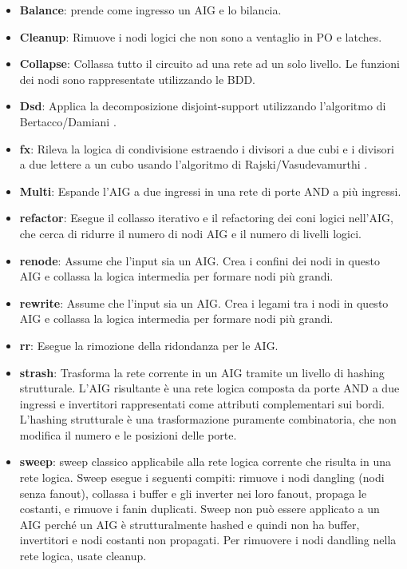 \documentclass[
  italian,
]{book}
\providecommand{\tightlist}{%
  \setlength{\itemsep}{0pt}\setlength{\parskip}{0pt}}
\begin{document}
\begin{itemize}
\tightlist
\item
  \textbf{Balance}: prende come ingresso un AIG e lo bilancia.
\item
  \textbf{Cleanup}: Rimuove i nodi logici che non sono a ventaglio in PO e latches.
\item
  \textbf{Collapse}: Collassa tutto il circuito ad una rete ad un solo livello. Le funzioni dei nodi sono rappresentate utilizzando le BDD.
\item
  \textbf{Dsd}: Applica la decomposizione disjoint-support utilizzando l'algoritmo di Bertacco/Damiani \citep{ICCAD97}.
\item
  \textbf{fx}: Rileva la logica di condivisione estraendo i divisori a due cubi e i divisori a due lettere a un cubo usando l'algoritmo di Rajski/Vasudevamurthi \citep{TCAD92}.
\item
  \textbf{Multi}: Espande l'AIG a due ingressi in una rete di porte AND a più ingressi.
\item
  \textbf{refactor}: Esegue il collasso iterativo e il refactoring dei coni logici nell'AIG, che cerca di ridurre il numero di nodi AIG e il numero di livelli logici.
\item
  \textbf{renode}: Assume che l'input sia un AIG. Crea i confini dei nodi in questo AIG e collassa la logica intermedia per formare nodi più grandi.
\item
  \textbf{rewrite}: Assume che l'input sia un AIG. Crea i legami tra i nodi in questo AIG e collassa la logica intermedia per formare nodi più grandi.
\item
  \textbf{rr}: Esegue la rimozione della ridondanza per le AIG.
\item
  \textbf{strash}: Trasforma la rete corrente in un AIG tramite un livello di hashing strutturale. L'AIG risultante è una rete logica composta da porte AND a due ingressi e invertitori rappresentati come attributi complementari sui bordi. L'hashing strutturale è una trasformazione puramente combinatoria, che non modifica il numero e le posizioni delle porte.
\item
  \textbf{sweep}: sweep classico applicabile alla rete logica corrente che risulta in una rete logica. Sweep esegue i seguenti compiti: rimuove i nodi dangling (nodi senza fanout), collassa i buffer e gli inverter nei loro fanout, propaga le costanti, e rimuove i fanin duplicati. Sweep non può essere applicato a un AIG perché un AIG è strutturalmente hashed e quindi non ha buffer, invertitori e nodi costanti non propagati. Per rimuovere i nodi dandling nella rete logica, usate cleanup.
\end{itemize}
\end{document}
